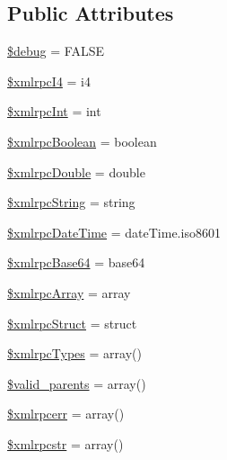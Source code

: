 \subsection*{Public Attributes}
\begin{DoxyCompactItemize}
\item 
\mbox{\hyperlink{class_c_i___xmlrpc_a85ae3e64cd40e9564adceb010085e9dd}{\$debug}} = F\+A\+L\+SE
\item 
\mbox{\hyperlink{class_c_i___xmlrpc_a4d41d61a02c60406c56254f0988b8141}{\$xmlrpc\+I4}} = \textquotesingle{}i4\textquotesingle{}
\item 
\mbox{\hyperlink{class_c_i___xmlrpc_a1bf451bf41226cf1702f54fa46b041f2}{\$xmlrpc\+Int}} = \textquotesingle{}int\textquotesingle{}
\item 
\mbox{\hyperlink{class_c_i___xmlrpc_abb241cb9cac2595c7ef28106808ec438}{\$xmlrpc\+Boolean}} = \textquotesingle{}boolean\textquotesingle{}
\item 
\mbox{\hyperlink{class_c_i___xmlrpc_aa412c6bea7572d0e508b5ef9d2213db3}{\$xmlrpc\+Double}} = \textquotesingle{}double\textquotesingle{}
\item 
\mbox{\hyperlink{class_c_i___xmlrpc_a69f8b2c87014597d1f5509ec934ceeea}{\$xmlrpc\+String}} = \textquotesingle{}string\textquotesingle{}
\item 
\mbox{\hyperlink{class_c_i___xmlrpc_ad0ef2c8353643b73afe4636a5fb84cff}{\$xmlrpc\+Date\+Time}} = \textquotesingle{}date\+Time.\+iso8601\textquotesingle{}
\item 
\mbox{\hyperlink{class_c_i___xmlrpc_a95dc3164d1c3e1fdaf7185095fb376ae}{\$xmlrpc\+Base64}} = \textquotesingle{}base64\textquotesingle{}
\item 
\mbox{\hyperlink{class_c_i___xmlrpc_aedecd71f2438e9a44a8f5a1dc73f4c7a}{\$xmlrpc\+Array}} = \textquotesingle{}array\textquotesingle{}
\item 
\mbox{\hyperlink{class_c_i___xmlrpc_a9a499285050ed5c867eec71854231f01}{\$xmlrpc\+Struct}} = \textquotesingle{}struct\textquotesingle{}
\item 
\mbox{\hyperlink{class_c_i___xmlrpc_a2b937e1ca5ee8495f0251a74222cec64}{\$xmlrpc\+Types}} = array()
\item 
\mbox{\hyperlink{class_c_i___xmlrpc_a801945a338a9dee5f723c00cb71657b7}{\$valid\+\_\+parents}} = array()
\item 
\mbox{\hyperlink{class_c_i___xmlrpc_a915a90a791db11a94f665567d2f5ad01}{\$xmlrpcerr}} = array()
\item 
\mbox{\hyperlink{class_c_i___xmlrpc_a89bbdd6a565dd3af2378b44fc5f156a0}{\$xmlrpcstr}} = array()

\end{DoxyCompactItemize}
